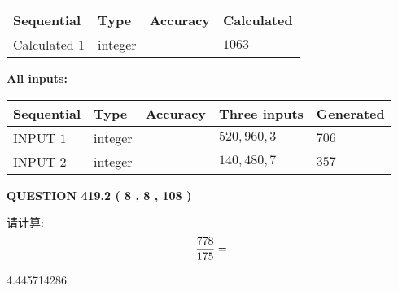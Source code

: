 \documentclass{ctexart}
\begin{document}
   
   
   
\noindent{}
   
   
  
  
\noindent\begin{tabular}{|l|l|l|l|}
\hline
 Sequential & Type & Accuracy & Calculated \\ 
\hline
 
 
  Calculated $  1 $ & integer &  & 
  $ 1063 $ 
 \\  \hline  
 \end{tabular}
   
   
   
   
\noindent\vspace{0.1in}\hspace{-0.08in} {\textbf{\Large{All inputs: }}}
   
   
  
  
\noindent\begin{tabular}{|l|l|l|l|l|}
\hline
 Sequential & Type & Accuracy & Three inputs & Generated \\ 
\hline
 
 
  INPUT $  1 $ & integer &  & $
 520
 , 
 960
 , 
 3
 $ & $ 706 $ 
 \\  \hline  
 
 
  INPUT $  2 $ & integer &  & $
 140
 , 
 480
 , 
 7
 $ & $ 357 $ 
 \\  \hline  
 \end{tabular}
   
   
  
\vspace{0.2in}
  
{\textbf{\Large{QUESTION
419.2 
 ( 8 , 8 , 108 )
}}}
  
  
 
请计算:
\begin{equation}
\frac { %
778 }  {  %
175} = \nonumber
\end{equation}
 
 
 
\noindent{}
 
 

4.445714286
 
 
\noindent{}
 
 

 
 
 
\noindent{}
 
\end{document}
